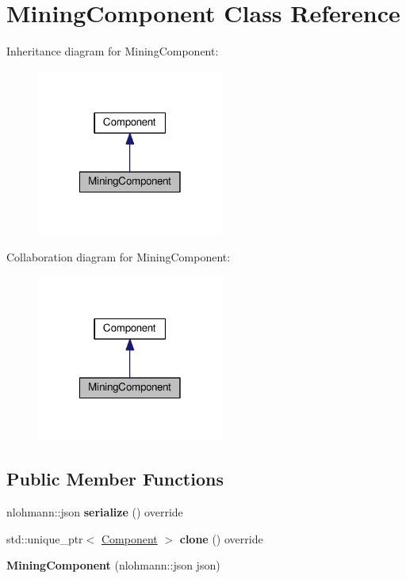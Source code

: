 \hypertarget{classMiningComponent}{\section{Mining\-Component Class Reference}
\label{classMiningComponent}
}


Inheritance diagram for Mining\-Component\-:
\nopagebreak
\begin{figure}[H]
\begin{center}
\leavevmode
\includegraphics[width=174pt]{classMiningComponent__inherit__graph}
\end{center}
\end{figure}


Collaboration diagram for Mining\-Component\-:
\nopagebreak
\begin{figure}[H]
\begin{center}
\leavevmode
\includegraphics[width=174pt]{classMiningComponent__coll__graph}
\end{center}
\end{figure}
\subsection*{Public Member Functions}
\begin{DoxyCompactItemize}
\item 
\hypertarget{classMiningComponent_aef94862cb965489288364e7db92d5c4c}{nlohmann\-::json {\bfseries serialize} () override}\label{classMiningComponent_aef94862cb965489288364e7db92d5c4c}

\item 
\hypertarget{classMiningComponent_a091384ebeb7d2a8500a145a3898a9aa5}{std\-::unique\-\_\-ptr$<$ \hyperlink{classComponent}{Component} $>$ {\bfseries clone} () override}\label{classMiningComponent_a091384ebeb7d2a8500a145a3898a9aa5}

\item 
\hypertarget{classMiningComponent_a42cae8f485a184d219bf18ce68b1a84f}{{\bfseries Mining\-Component} (nlohmann\-::json json)}\label{classMiningComponent_a42cae8f485a184d219bf18ce68b1a84f}

\end{DoxyCompactItemize}
